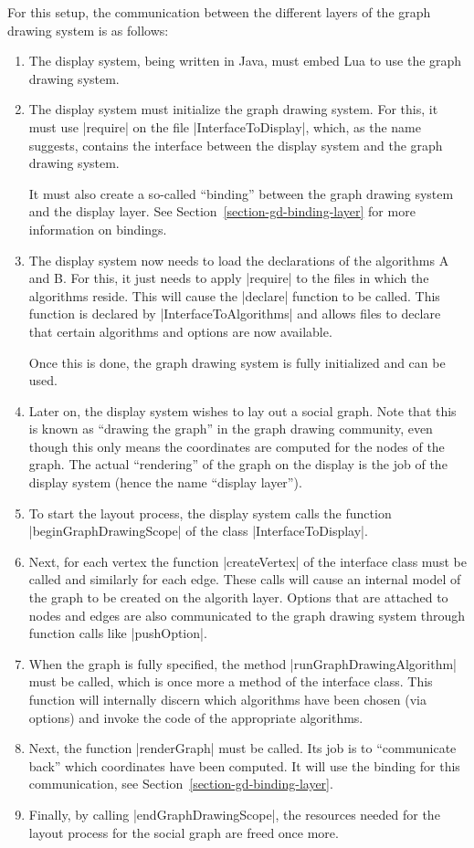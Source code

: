 For this setup, the communication between the different layers of the
graph drawing system is as follows:

\begin{enumerate}
\item The display system, being written in Java, must embed Lua to use the
  graph drawing system.
\item The display system must initialize the graph drawing system. For this,
  it must use |require| on the file |InterfaceToDisplay|, which, as
  the name suggests, contains the interface between the display
  system and the graph drawing system.
  
  It must also create a so-called ``binding'' between the
  graph drawing system and the display layer. See
  Section~\ref{section-gd-binding-layer} for more information on
  bindings.
\item The display system now needs to load the declarations of the
  algorithms A and B. For this, it just needs to apply |require| to
  the files in which the algorithms reside. This will cause the
  |declare| function to be called. This function is declared by
  |InterfaceToAlgorithms| and allows files to declare that certain
  algorithms and options are now available.

  Once this is done, the graph drawing system is fully initialized and
  can be used.
\item Later on, the display system wishes to lay out a social graph. Note
  that this is known as ``drawing the graph'' in the graph drawing
  community, even though this only means the coordinates are computed
  for the nodes of the graph. The actual ``rendering'' of the graph on
  the display is the job of the display system (hence the name ``display
  layer'').
\item To start the layout process, the display system calls the function
  |beginGraphDrawingScope| of the class |InterfaceToDisplay|.
\item Next, for each vertex the function |createVertex| of the
  interface class must be called and similarly for each edge. These
  calls will cause an internal model of the graph to be created on the
  algorith layer. Options that are attached to nodes and edges are
  also communicated to the graph drawing system through function calls
  like |pushOption|.
\item When the graph is fully specified, the method
  |runGraphDrawingAlgorithm| must be called, which is once more a
  method of the interface class. This function will internally discern
  which algorithms have been chosen (via options) and invoke the code
  of the appropriate algorithms.
\item Next, the function |renderGraph| must be called. Its job is to
  ``communicate back'' which coordinates have been computed. It will
  use the binding for this communication, see
  Section~\ref{section-gd-binding-layer}.
\item Finally, by calling |endGraphDrawingScope|, the resources needed
  for the layout process for the social graph are freed once more.
\end{enumerate}

